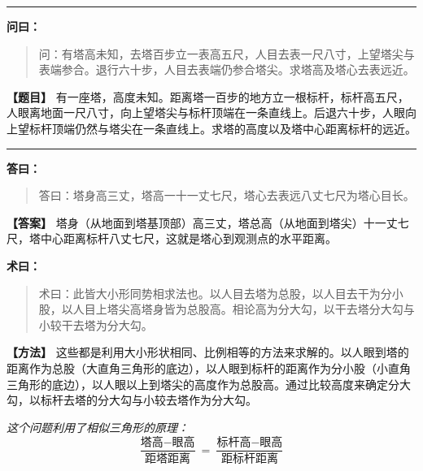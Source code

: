 \documentclass[11pt,a4paper]{article}
\newenvironment{mathproblem}[1][]{%
  \medskip\noindent\rule{\textwidth}{0.4pt}%
  \par\noindent{\Large\bfseries\color{sectioncolor}#1}\par\nopagebreak%
  \smallskip%
}{%
  \par\noindent\rule{\textwidth}{0.4pt}\medskip%
}
\newcommand{\wenlabel}{\textbf{\color{origcolor}问曰：}}
\newcommand{\dalabel}{\textbf{\color{origcolor}答曰：}}
\newcommand{\shulabel}{\textbf{\color{origcolor}术曰：}}
\newcommand{\modwenlabel}{\textbf{\color{modcolor}【题目】}}
\newcommand{\moddalabel}{\textbf{\color{modcolor}【答案】}}
\newcommand{\modshulabel}{\textbf{\color{modcolor}【方法】}}
\begin{document}
\begin{mathproblem}[\textbf{第六问：测塔高远}]

\begin{originaltext}
\wenlabel
\begin{quote}
\textcolor{origcolor}{%
问：有塔高未知，去塔百步立一表高五尺，人目去表一尺八寸，上望塔尖与表端参合。退行六十步，人目去表端仍参合塔尖。求塔高及塔心去表远近。
}
\end{quote}
\end{originaltext}

\begin{moderntext}
\modwenlabel
有一座塔，高度未知。距离塔一百步的地方立一根标杆，标杆高五尺，人眼离地面一尺八寸，向上望塔尖与标杆顶端在一条直线上。后退六十步，人眼向上望标杆顶端仍然与塔尖在一条直线上。求塔的高度以及塔中心距离标杆的远近。
\end{moderntext}

\end{mathproblem}

\begin{originaltext}
\dalabel
\begin{quote}
\textcolor{origcolor}{%
答曰：塔身高三丈，塔高一十一丈七尺，塔心去表远八丈七尺为塔心目长。
}
\end{quote}
\end{originaltext}

\begin{moderntext}
\moddalabel
塔身（从地面到塔基顶部）高三丈，塔总高（从地面到塔尖）十一丈七尺，塔中心距离标杆八丈七尺，这就是塔心到观测点的水平距离。
\end{moderntext}

\begin{originaltext}
\shulabel
\begin{quote}
\textcolor{origcolor}{%
术曰：此皆大小形同势相求法也。以人目去塔为总股，以人目去干为分小股，以人目上塔尖高塔身皆为总股高。相论高为分大勾，以干去塔分大勾与小较干去塔为分大勾。
}
\end{quote}
\end{originaltext}

\begin{moderntext}
\modshulabel
这些都是利用大小形状相同、比例相等的方法来求解的。以人眼到塔的距离作为总股（大直角三角形的底边），以人眼到标杆的距离作为分小股（小直角三角形的底边），以人眼以上到塔尖的高度作为总股高。通过比较高度来确定分大勾，以标杆去塔的分大勾与小较去塔作为分大勾。

\textit{这个问题利用了相似三角形的原理：}
\[
\frac{\text{塔高} - \text{眼高}}{\text{距塔距离}} = 
\frac{\text{标杆高} - \text{眼高}}{\text{距标杆距离}}
\]
\end{moderntext}
\end{document}

